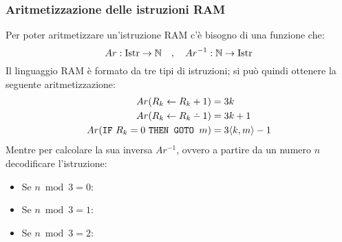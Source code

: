 \subsubsection*{Aritmetizzazione delle istruzioni RAM}\label{sec:aritm_ram}
Per poter aritmetizzare un'istruzione RAM c'è bisogno di una funzione che:
$$ Ar:\text{Istr}\to\mathbb{N} \quad , \quad Ar^{-1}:\mathbb{N}\to\text{Istr} $$
Il linguaggio RAM è formato da tre tipi di istruzioni; si può quindi ottenere la
seguente aritmetizzazione:
$$ \begin{aligned}
    Ar(R_k\leftarrow R_k+1) &= 3k\\
    Ar(R_k\leftarrow R_k\dotminus1) &= 3k+1\\
    Ar(\goto{R_k}{m}) &= 3\cantor{k,m}-1
\end{aligned} $$
Mentre per calcolare la sua inversa $Ar^{-1}$, ovvero a partire da un numero $n$ decodificare
l'istruzione:
\begin{itemize}
    \item Se $n\bmod{3}=0$:
    \item Se $n\bmod{3}=1$:
    \item Se $n\bmod{3}=2$:
\end{itemize}

